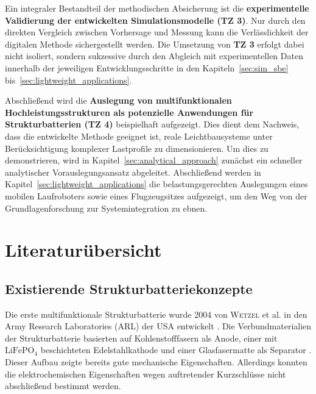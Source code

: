 Ein integraler Bestandteil der methodischen Absicherung ist die \textbf{experimentelle Validierung der entwickelten Simulationsmodelle (TZ 3)}. Nur durch den direkten Vergleich zwischen Vorhersage und Messung kann die Verlässlichkeit der digitalen Methode sichergestellt werden. Die Umsetzung von \textbf{TZ 3} erfolgt dabei nicht isoliert, sondern sukzessive durch den Abgleich mit experimentellen Daten innerhalb der jeweiligen Entwicklungsschritte in den Kapiteln~\ref{sec:sim_sbe} bis~\ref{sec:lightweight_applications}.

Abschließend wird die \textbf{Auslegung von multifunktionalen Hochleistungsstrukturen als potenzielle Anwendungen für Strukturbatterien (TZ 4)} beispielhaft aufgezeigt. Dies dient dem Nachweis, dass die entwickelte Methode geeignet ist, reale Leichtbausysteme unter Berücksichtigung komplexer Lastprofile zu dimensionieren. Um dies zu demonstrieren, wird in Kapitel~\ref{sec:analytical_approach} zunächst ein schneller analytischer Vorauslegungsansatz abgeleitet. Abschließend werden in Kapitel~\ref{sec:lightweight_applications} die belastungsgerechten Auslegungen eines mobilen Laufroboters sowie eines Flugzeugsitzes aufgezeigt, um den Weg von der Grundlagenforschung zur Systemintegration zu ebnen.


\section{\label{sec:Literaturübersicht}Literaturübersicht}

\subsection*{Existierende Strukturbatteriekonzepte}

Die erste multifunktionale Strukturbatterie wurde 2004 von \textsc{Wetzel} et al. in den Army Research Laboratories (ARL) der USA entwickelt \cite{Wetzel2004, Snyder2006, Wong2007, Snyder2007}. Die Verbundmaterialien der Strukturbatterie  basierten auf Kohlenstofffasern als Anode, einer mit $\text{LiFePO}_\text{4}$ beschichteten Edelstahlkathode und einer Glasfasermatte als Separator \cite{Wong2007}. Dieser Aufbau zeigte bereits gute mechanische Eigenschaften. Allerdings konnten die elektrochemischen Eigenschaften wegen auftretender Kurzschlüsse nicht abschließend bestimmt werden.

